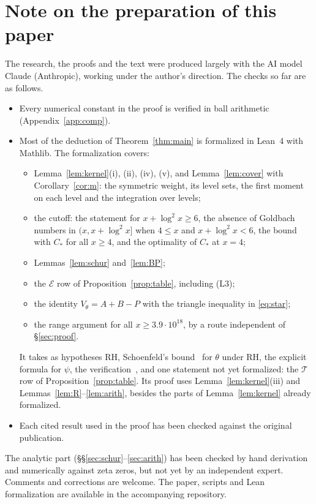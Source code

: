 \documentclass[11pt]{amsart}
\theoremstyle{remark}
\begin{document}
\section*{Note on the preparation of this paper}
The research, the proofs and the text were produced largely with the AI model Claude (Anthropic), working under the author's direction. The checks so far are as follows.
\begin{itemize}
\item Every numerical constant in the proof is verified in ball arithmetic (Appendix~\ref{app:comp}).
\item Most of the deduction of Theorem~\ref{thm:main} is formalized in Lean~4 with Mathlib. The formalization covers:
\begin{itemize}
\item[--] Lemma~\ref{lem:kernel}(i), (ii), (iv), (v), and Lemma~\ref{lem:cover} with Corollary~\ref{cor:m}: the symmetric weight, its level sets, the first moment on each level and the integration over levels;
\item[--] the cutoff: the statement for $x+\log^2x\ge6$, the absence of Goldbach numbers in $(x,x+\log^2x]$ when $4\le x$ and $x+\log^2x<6$, the bound with $C_*$ for all $x\ge4$, and the optimality of $C_*$ at $x=4$;
\item[--] Lemmas~\ref{lem:schur} and~\ref{lem:BP};
\item[--] the $\mathcal E$ row of Proposition~\ref{prop:table}, including (L3);
\item[--] the identity $V_\theta=A+B-P$ with the triangle inequality in \eqref{eq:star};
\item[--] the range argument for all $x\ge3.9\cdot10^{18}$, by a route independent of \S\ref{sec:proof}.
\end{itemize}
It takes as hypotheses RH, Schoenfeld's bound~\cite[Thm.~10, (6.3)]{Schoenfeld} for $\theta$ under RH, the explicit formula for $\psi$, the verification~\cite{OHP}, and one statement not yet formalized: the $\mathcal T$ row of Proposition~\ref{prop:table}. Its proof uses Lemma~\ref{lem:kernel}(iii) and Lemmas~\ref{lem:R}--\ref{lem:arith}, besides the parts of Lemma~\ref{lem:kernel} already formalized.
\item Each cited result used in the proof has been checked against the original publication.
\end{itemize}
The analytic part (\S\S\ref{sec:schur}--\ref{sec:arith}) has been checked by hand derivation and numerically against zeta zeros, but not yet by an independent expert. Comments and corrections are welcome. The paper, scripts and Lean formalization are available in the accompanying repository.
\end{document}
